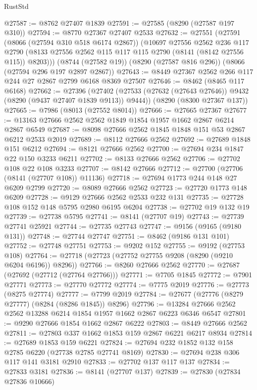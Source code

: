\begin{lexlean}{RustStd}
\begin{coremodule}
@27587 := @8762 @27407 @1839
@27591 := @27585 (@8290 (@27587 @197 @310))
@27594 := @8770 @27367 @27407 @2533
@27632 := @27551
    (@27591
      (@8066 (@27594 @310 @518 @6174 @2867))
      (@10697
        @27556
        @2562
        @236
        @117
        @2790
        (@8133 @27556 @2562 @115 @117 @115 @2790 (@8141 (@8142 @27556 @115)) @8203)))
    (@8744 (@27582 @19))
    (@8290 (@27587 @816 @296))
    (@8066 (@27594 @296 @197 @2897 @2867))
@27643 := @8449 @27367 @2562 @266 @117 @244 @27 @2867 @2799 @6168 @8369 @27507
@27646 := @8462 (@8465 @117 @6168)
@27662 := @27396
    (@27402 (@27533 (@27632 (@27643 @27646)) @9432 (@8290 (@9437 @27407 @1839 @9113)) @9444))
    (@8290 (@8300 @27367 @137))
@27665 := @7986 (@8013 (@27552 @8014))
@27666 := @27665 @27367
@27677 := @13163 @27666 @2562 @2562 @1849 @1854 @1957 @1662 @2867 @6214 @2867 @6549
@27687 := @8098 @27666 @2562 @1845 @1848 @151 @53 @2867 @6212 @2533 @2019
@27689 := @8112 @27666 @2562
@27692 := @27689 @1848 @151 @6212
@27694 := @8121 @27666 @2562
@27700 := @27694 @234 @1847 @22 @150 @3233 @6211
@27702 := @8133 @27666 @2562
@27706 := @27702 @108 @22 @108 @3233
@27707 := @8142 @27666
@27712 := @27700 (@27706 (@8141 (@27707 @108)) @11136)
@27718 := @27694 @1773 @244 @148 @27 @6209 @2799
@27720 := @8089 @27666 @2562
@27723 := @27720 @1773 @148 @6209
@27728 := @9129 @27666 @2562 @2533 @232 @131
@27735 := @27728 @108 @152 @148 @5795 @2980 @6195 @6204
@27738 := @27702 @19 @132 @19
@27739 := @27738 @5795
@27741 := @8141 (@27707 @19)
@27743 := @27739 @27741 @25921
@27744 := @27735 @27743
@27747 := @9156 (@9165 (@9180 @131))
@27748 := @27744 @27747
@27751 := @8462 (@9186 @131 @101)
@27752 := @27748 @27751
@27753 := @9202 @152
@27755 := @9192 (@27753 @108)
@27764 := @27718 (@27723 (@27752 @27755 @9208 (@8290 (@9210 @6204 @6196)) @8296))
@27766 := @8260 @27666 @2562
@27770 := @27687 (@27692 (@27712 (@27764 @27766)))
@27771 := @7705 @1845
@27772 := @7901 @27771
@27773 := @27770 @27772
@27774 := @7775 @2019
@27776 := @27773 (@8275 @27774)
@27777 := @7799 @2019
@27784 := @27677 (@27776 (@8279 @27777) (@8284 (@8286 @1845)) @8296)
@27796 := @13284 @27666 @2562 @2562 @13288 @6214 @1854 @1957 @1662 @2867 @6223 @6346 @6547
@27801 := @9290 @27666 @1854 @1662 @2867 @6222
@27803 := @8449 @27666 @2562
@27811 := @27803 @337 @1662 @1853 @159 @2867 @6221 @6217 @8934
@27814 := @27689 @1853 @159 @6221
@27824 := @27694 @232 @1852 @132 @158 @2785 @6220 (@27738 @2785 @27741 @8169)
@27830 := @27694 @238 @306 @117 @141 @3181 @2910
@27833 := @27702 @137 @117 @137
@27834 := @27833 @3181
@27836 := @8141 (@27707 @137)
@27839 := @27830 (@27834 @27836 @10666)

\end{coremodule}
\end{lexlean}
